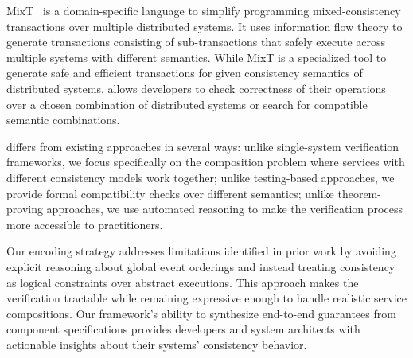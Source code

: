 MixT~\cite{mixt} is a domain-specific language to simplify
programming mixed-consistency transactions over multiple
distributed systems. It uses information flow theory to
generate transactions consisting of sub-transactions
that safely execute across multiple systems with different
semantics. While MixT is a specialized tool to generate
safe and efficient transactions for given consistency semantics
of distributed systems, \sysname{} allows developers to check
correctness of their operations over a chosen combination of
distributed systems or search for compatible semantic
combinations.

\sysname{} differs from existing approaches in several ways:
unlike single-system verification frameworks,
we focus specifically on the composition problem where services with
different consistency models work together; unlike testing-based
approaches, we provide formal compatibility checks over different semantics;
unlike theorem-proving approaches, we use automated reasoning to make
the verification process more accessible to practitioners.

Our encoding strategy addresses limitations identified in prior work
by avoiding explicit reasoning about global event orderings and
instead treating consistency as logical constraints over abstract
executions. This approach makes the verification tractable
while remaining expressive enough to handle realistic service
compositions. Our framework's ability to synthesize end-to-end
guarantees from component specifications provides developers and
system architects with actionable insights about their systems'
consistency behavior.


